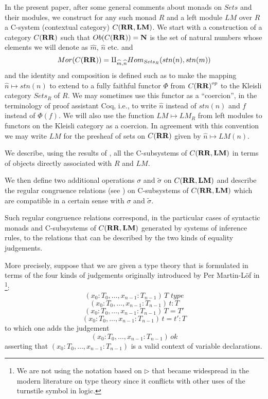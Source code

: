 \documentclass[11pt]{article}
\newcommand{\nn}{{\bf N\rm}}
\newcommand{\wt}{\widetilde}
\newcommand{\wh}{\widehat}
\newcommand{\RR}{{\bf RR}}
\newcommand{\LM}{{\bf LM}}
\begin{document}
In the present paper, after some general comments about monads on $Sets$ and their modules, we construct for any such monad $R$ and a left module $LM$ over $R$ a C-system (contextual category) $C(\RR,\LM)$.  We start with a construction of a category ${C(\RR)}$ such that $Ob({C(\RR)})=\nn$ is the set of natural numbers whose elements we will denote as $\wh{m}$, $\wh{n}$ etc. and
%
$$Mor({C(\RR)})=\amalg_{\wh{m},\wh{n}}Hom_{Sets_R}(stn(n),stn(m))$$
%
and the identity and composition is defined such as to make the mapping $\wh{n}\mapsto stn(n)$ to extend to a fully faithful functor $\Phi$ from ${C(\RR)}^{op}$ to the Kleisli category $Sets_R$ of $R$.  We may sometimes  use this functor as a ``coercion'', in the terminology of proof assistant Coq, i.e., to write $\wh{n}$ instead of $stn(n)$ and $f$ instead of $\Phi(f)$. We will also use the function $LM\mapsto LM_R$ from left modules to functors on the Kleisli category as a coercion. In agreement with this convention we may write $LM$ for the presheaf of sets on ${C(\RR)}$ given by $\wh{n}\mapsto LM(n)$.  

We describe, using the results of \cite{Csubsystems}, all the C-subsystems of $C(\RR,\LM)$ in terms of objects directly associated with $R$ and $LM$. 

We then define two additional operations $\sigma$ and $\wt{\sigma}$ on $C(\RR,\LM)$ and describe the regular congruence relations (see \cite{Csubsystems}) on C-subsystems of $C(\RR,\LM)$ which are compatible in a certain sense with $\sigma$ and $\wt{\sigma}$.

Such regular congruence relations correspond, in the particular cases of syntactic monads and C-subsystems of $C(\RR,\LM)$ generated by systems of inference rules, to the relations that can be described by the two kinds of equality judgements. 

More precisely, suppose that we are given a type theory that is formulated in terms of the four kinds of judgements originally introduced by Per Martin-L\"{o}f in \cite[p.161]{MLTT79}\footnote{We are not using the notation based on $\rhd$ that became widespread in the modern literature on type theory since it conflicts with other uses of the turnstile symbol in logic.}:
%
$$(x_0:T_0,\dots,x_{n-1}:T_{n-1})\,T\,\,type$$
$$(x_0:T_0,\dots,x_{n-1}:T_{n-1})\,t:T$$
$$(x_0:T_0,\dots,x_{n-1}:T_{n-1})\,T=T'$$
$$(x_0:T_0,\dots,x_{n-1}:T_{n-1})\,t=t':T$$
%
to which one adds the judgement
%
$$(x_0:T_0,\dots,x_{n-1}:T_{n-1})\,ok$$
%
asserting that $(x_0:T_0,\dots,x_{n-1}:T_{n-1})$ is a valid context of variable declarations.
\end{document}
